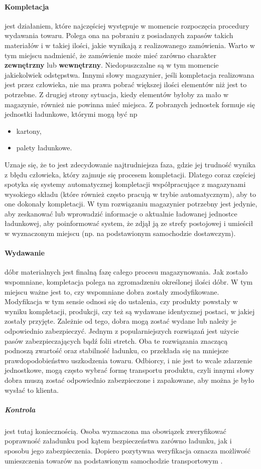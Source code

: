 	\paragraph{Kompletacja} \label{c4:kompletacja} jest działaniem, które najczęściej występuje w momencie rozpoczęcia procedury
	wydawania towaru. Polega ona na pobraniu z posiadanych zapasów takich materiałów i w takiej ilości, jakie
	wynikają z realizowanego zamówienia. Warto w tym miejscu nadmienić, że zamówienie może mieć zarówno
	charakter \textbf{zewnętrzny} lub \textbf{wewnętrzny}. Niedopuszczalne są w tym momencie jakiekolwiek odstępstwa. Innymi słowy
	magazynier, jeśli kompletacja realizowana jest przez człowieka, nie ma prawa pobrać większej ilości elementów niż
	jest to potrzebne. Z drugiej strony sytuacja, kiedy elementów byłoby za mało w magazynie, również nie 
	powinna mieć miejsca. Z pobranych jednostek formuje się jednostki ładunkowe, którymi mogą być np
	\begin{itemize}
		\item kartony,
		\item palety ładunkowe.
	\end{itemize}
	Uznaje się, że to jest zdecydowanie najtrudniejsza faza, gdzie jej trudność wynika z błędu człowieka, który zajmuje się
	procesem kompletacji. Dlatego coraz częściej spotyka się systemy automatycznej kompletacji współpracujące z magazynami
	wysokiego składu (które również często pracują w trybie automatycznym), aby to one dokonały kompletacji. W tym rozwiązaniu
	magazynier potrzebny jest jedynie, aby zeskanować lub wprowadzić informacje o aktualnie ładowanej jednostce ładunkowej, aby
	poinformować system, że zdjął ją ze strefy postojowej i umieścił w wyznaczonym miejscu (np. na podstawionym samochodzie
	dostawczym). 	
	\paragraph{Wydawanie} dóbr materialnych jest finalną fazę całego procesu magazynowania. 
	Jak zosta\-ło wspomniane, kompletacja polega na zgromadzeniu określonej ilości dóbr. W tym miejscu
	ważne jest to, czy wspomniane dobra zostały zmodyfikowane. Modyfikacja w tym sensie odnosi się do ustalenia, czy produkty
	powstały w wyniku kompletacji, produkcji, czy też są wydawane identycznej postaci, w jakiej zostały przyjęte. Zależnie
	od tego, dobra mogą zostać wydane lub należy je odpowiednio zabezpieczyć. Jednym z popularniejszych rozwiązań jest użycie
	pasów zabezpieczających bądź folii stretch. Oba te rozwiązania znaczącą podnoszą zwartość oraz stabilność ładunku, co
	przekłada się na mniejsze prawdopodobieństwo uszkodzenia towaru. Odbiorcy, i nie jest to wcale zdarzenie jednostkowe,
	mogą często wybrać formę transportu produktu, czyli innymi słowy dobra muszą zostać odpowiednio zabezpieczone i zapakowane,
	aby można je było wysłać to klienta. 
		\subparagraph{Kontrola} jest tutaj koniecznością. Osoba wyznaczona ma obowiązek zweryfikować 
		popra\-wność załadunku pod kątem bezpieczeństwa zarówno ładunku, jak i sposobu jego 
		zabezpieczenia. Dopiero pozytywna weryfikacja oznacza możliwość umieszczenia
		towarów na podstawionym samochodzie transportowym \cite{PL_FM}.
		
